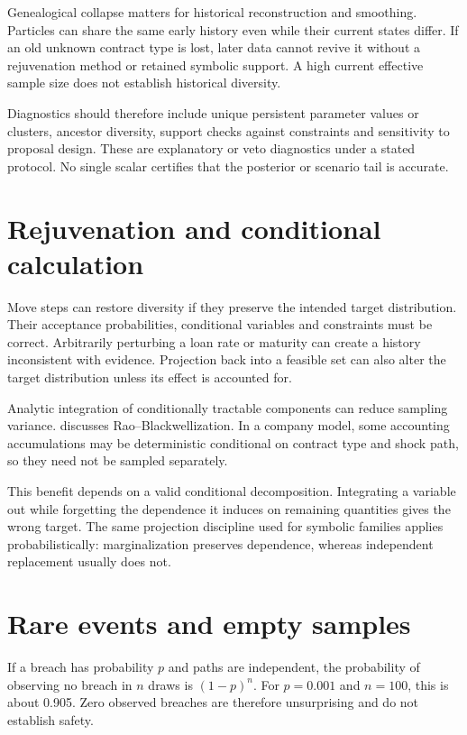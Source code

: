 Genealogical collapse matters for historical reconstruction and smoothing. Particles can share the same early history even while their current states differ. If an old unknown contract type is lost, later data cannot revive it without a rejuvenation method or retained symbolic support. A high current effective sample size does not establish historical diversity.

Diagnostics should therefore include unique persistent parameter values or clusters, ancestor diversity, support checks against constraints and sensitivity to proposal design. These are explanatory or veto diagnostics under a stated protocol. No single scalar certifies that the posterior or scenario tail is accurate.

\section{Rejuvenation and conditional calculation}
Move steps can restore diversity if they preserve the intended target distribution. Their acceptance probabilities, conditional variables and constraints must be correct. Arbitrarily perturbing a loan rate or maturity can create a history inconsistent with evidence. Projection back into a feasible set can also alter the target distribution unless its effect is accounted for.

Analytic integration of conditionally tractable components can reduce sampling variance. \citet[Section 4.6]{doucet2012tutorial} discusses Rao--Blackwellization. In a company model, some accounting accumulations may be deterministic conditional on contract type and shock path, so they need not be sampled separately.

This benefit depends on a valid conditional decomposition. Integrating a variable out while forgetting the dependence it induces on remaining quantities gives the wrong target. The same projection discipline used for symbolic families applies probabilistically: marginalization preserves dependence, whereas independent replacement usually does not.

\section{Rare events and empty samples}
If a breach has probability $p$ and paths are independent, the probability of observing no breach in $n$ draws is $(1-p)^n$. For $p=0.001$ and $n=100$, this is about 0.905. Zero observed breaches are therefore unsurprising and do not establish safety.

